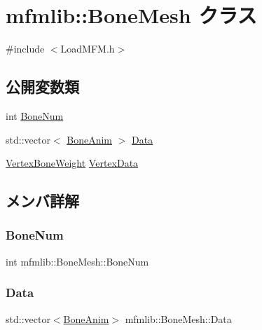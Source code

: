 \hypertarget{classmfmlib_1_1_bone_mesh}{}\section{mfmlib\+:\+:Bone\+Mesh クラス}
\label{classmfmlib_1_1_bone_mesh}


{\ttfamily \#include $<$Load\+M\+F\+M.\+h$>$}

\subsection*{公開変数類}
\begin{DoxyCompactItemize}
\item 
int \mbox{\hyperlink{classmfmlib_1_1_bone_mesh_a56275d3c9a8cc5ca1026f6498b3bedc3}{Bone\+Num}}
\item 
std\+::vector$<$ \mbox{\hyperlink{classmfmlib_1_1_bone_anim}{Bone\+Anim}} $>$ \mbox{\hyperlink{classmfmlib_1_1_bone_mesh_a3ec6ff3ede0f20ad419500c80ce2e6c1}{Data}}
\item 
\mbox{\hyperlink{classmfmlib_1_1_vertex_bone_weight}{Vertex\+Bone\+Weight}} \mbox{\hyperlink{classmfmlib_1_1_bone_mesh_ab252d2d15dc2e927471943a33b19fbc4}{Vertex\+Data}}
\end{DoxyCompactItemize}


\subsection{メンバ詳解}
\mbox{\label{classmfmlib_1_1_bone_mesh_a56275d3c9a8cc5ca1026f6498b3bedc3}} 
\subsubsection{\texorpdfstring{Bone\+Num}{BoneNum}}
{\footnotesize\ttfamily int mfmlib\+::\+Bone\+Mesh\+::\+Bone\+Num}

\mbox{\label{classmfmlib_1_1_bone_mesh_a3ec6ff3ede0f20ad419500c80ce2e6c1}} 
\subsubsection{\texorpdfstring{Data}{Data}}
{\footnotesize\ttfamily std\+::vector$<$\mbox{\hyperlink{classmfmlib_1_1_bone_anim}{Bone\+Anim}}$>$ mfmlib\+::\+Bone\+Mesh\+::\+Data}

